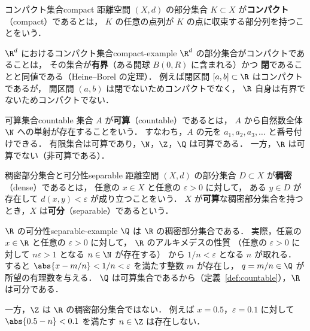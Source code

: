 \begin{definition}{コンパクト集合}{compact}
  距離空間 $(X, d)$ の部分集合 $K \subset X$ が\textbf{コンパクト}（compact）であるとは，
  $K$ の任意の点列が $K$ の点に収束する部分列を持つことをいう．
\end{definition}

\begin{example}{$\R^d$ におけるコンパクト集合}{compact-example}
  $\R^d$ の部分集合がコンパクトであることは，
  その集合が\textbf{有界}（ある開球 $B(0, R)$ に含まれる）かつ
  \textbf{閉}であることと同値である（Heine--Borel の定理）．
  例えば閉区間 $[a, b] \subset \R$ はコンパクトであるが，
  開区間 $(a, b)$ は閉でないためコンパクトでなく，
  $\R$ 自身は有界でないためコンパクトでない．
\end{example}

\begin{definition}{可算集合}{countable}
  集合 $A$ が\textbf{可算}（countable）であるとは，
  $A$ から自然数全体 $\N$ への単射が存在することをいう．
  すなわち，$A$ の元を $a_1, a_2, a_3, \ldots$ と番号付けできる．
  有限集合は可算であり，$\N$，$\Z$，$\Q$ は可算である．
  一方，$\R$ は可算でない（非可算である）．
\end{definition}

\begin{definition}{稠密部分集合と可分性}{separable}
  距離空間 $(X, d)$ の部分集合 $D \subset X$ が\textbf{稠密}（dense）であるとは，
  任意の $x \in X$ と任意の $\varepsilon > 0$ に対して，
  ある $y \in D$ が存在して $d(x, y) < \varepsilon$ が成り立つことをいう．
  $X$ が\textbf{可算}な稠密部分集合を持つとき，$X$ は\textbf{可分}（separable）であるという．
\end{definition}

\begin{example}{$\R$ の可分性}{separable-example}
  $\Q$ は $\R$ の稠密部分集合である．
  実際，任意の $x \in \R$ と任意の $\varepsilon > 0$ に対して，
  $\R$ のアルキメデスの性質
  （任意の $\varepsilon > 0$ に対して $n\varepsilon > 1$ となる $n \in \N$ が存在する）
  から $1/n < \varepsilon$ となる $n$ が取れる．
  すると $\abs{x - m/n} < 1/n < \varepsilon$ を満たす整数 $m$ が存在し，
  $q = m/n \in \Q$ が所望の有理数を与える．
  $\Q$ は可算集合であるから（定義~\ref{def:countable}），$\R$ は可分である．

  一方，$\Z$ は $\R$ の稠密部分集合ではない．
  例えば $x = 0.5$，$\varepsilon = 0.1$ に対して
  $\abs{0.5 - n} < 0.1$ を満たす $n \in \Z$ は存在しない．
\end{example}

